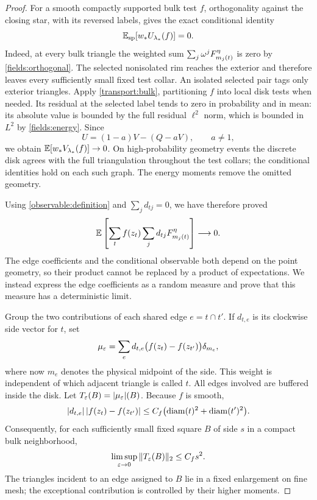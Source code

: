 \begin{proof}
For a smooth compactly supported bulk test $f$, orthogonality against the
closing star, with its reversed labels, gives the exact conditional
identity
\[
                 \mathbb E_{\mathrm{sp}}[w_*U_{\lambda_*}(f)]=0.
\]
Indeed, at every bulk triangle the weighted sum
$\sum_j\omega^jF_{m_j(t)}^\eta$ is zero by
\eqref{fields:orthogonal}. The selected nonisolated rim reaches the
exterior and therefore leaves every sufficiently small fixed test
collar. An isolated selected pair tags only exterior triangles. Apply
\eqref{transport:bulk}, partitioning $f$ into local disk tests when
needed. Its residual at the selected label tends to zero in probability
and in mean: its absolute value is bounded by the full residual
$\ell^2$ norm, which is bounded in $L^2$ by \eqref{fields:energy}.
Since
\[
 U=(1-a)V-(Q-aV),\qquad a\ne1,
\]
we obtain $\mathbb E[w_*V_{\lambda_*}(f)]\to0$. On high-probability geometry
events the discrete disk agrees with the full triangulation throughout
the test collars; the conditional identities hold on each such graph.
The energy moments remove the omitted geometry.

Using \eqref{observable:definition} and $\sum_jd_{tj}=0$, we have therefore
proved
\begin{equation}
 \mathbb E\left[\sum_t f(z_t)\sum_jd_{tj}F_{m_j(t)}^\eta\right]
                          \longrightarrow0.
 \label{observable:discrete-cr}
\end{equation}
The edge coefficients and the conditional observable both depend on the
point geometry, so their product cannot be replaced by a product of
expectations. We instead express the edge coefficients as a random
measure and prove that this measure has a deterministic limit.

Group the two contributions of each shared edge $e=t\cap t'$. If $d_{t,e}$
is its clockwise side vector for $t$, set
\[
 \mu_\varepsilon=\sum_e d_{t,e}\bigl(f(z_t)-f(z_{t'})\bigr)\delta_{m_e},
\]
where now $m_e$ denotes the physical midpoint of the side. This weight is
independent of which adjacent triangle is called $t$. All edges involved
are buffered inside the disk. Let $T_\varepsilon(B)=|\mu_\varepsilon|(B)$.
Because $f$ is smooth,
\[
 |d_{t,e}|\,|f(z_t)-f(z_{t'})|
 \le C_f\bigl(\operatorname{diam}(t)^2+\operatorname{diam}(t')^2\bigr).
\]
Consequently, for each sufficiently small fixed square $B$ of side $s$
in a compact bulk neighborhood,
\begin{equation}
        \limsup_{\varepsilon\to0}\|T_\varepsilon(B)\|_2\le C_fs^2.
 \label{observable:variation}
\end{equation}
The triangles incident to an edge assigned to $B$ lie in a fixed
enlargement on fine mesh; the exceptional contribution is controlled by
their higher moments.


\end{proof}
